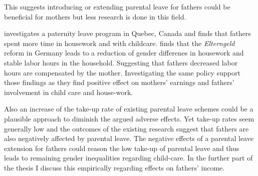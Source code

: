 This suggests introducing or extending parental leave for fathers could be beneficial for mothers but less research is done in this field.


\citet*{patnaikReservingTimeDaddy2019} investigates a paternity leave program in Quebec, Canada and finds that fathers spent more time in housework and with childcare.
\citet*{tammFathersParentalLeaveTaking2018} finds that the \textit{Elterngeld} reform in Germany leads to a reduction of gender differenes in housework and stable labor hours in the household.
Suggesting that fathers decreased labor hours are compensated by the mother.
Investigating the same policy \citet*{frodermannParentalLeavePolicy2023} support those findings as they find positive effect on mothers' earnings and fathers' involvement in child care and house-work.


Also an increase of the take-up rate of existing parental leave schemes could be a plausible approach to diminish the argued adverse effects.
Yet take-up rates seem generally low \citep*[see]{laliveParentalLeaveMothers2014, }%
and the outcomes of the existing research suggest that fathers are also negatively affected by parental leave.
The negative effects of a parental leave extension for fathers could reason the low take-up of parental leave and thus leads to remaining gender inequalities regarding child-care.
In the further part of the thesis I discuss this empirically regarding effects on fathers' income.

